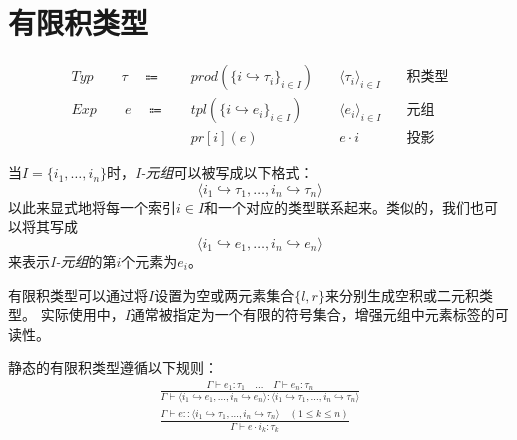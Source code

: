 \section{有限积类型}
\begin{equation*}
\begin{align}
Typ \qquad \tau \quad \Coloneqq \quad &prod(\{i \hookrightarrow \tau_i \}_{i\in I}) 
\quad &\langle \tau_i \rangle_{i\in I} \quad &\mbox{积类型} \\
Exp \qquad e \quad \Coloneqq \quad &tpl(\{i \hookrightarrow e_i \}_{i\in I}) 
\quad &\langle e_i \rangle_{i\in I} \quad &\mbox{元组} \\
&pr[i](e) \quad &e \cdot i \quad &\mbox{投影}
\end{align}
\end{equation*}


当$I=\{i_1,\dots,i_n\}$时，\textit{I-元组}可以被写成以下格式：
$$\langle i_1 \hookrightarrow \tau_1, \dots, i_n \hookrightarrow \tau_n \rangle$$
以此来显式地将每一个索引$i\in I$和一个对应的类型联系起来。类似的，我们也可以将其写成
$$\langle i_1 \hookrightarrow e_1, \dots, i_n \hookrightarrow e_n \rangle$$
来表示\textit{I-元组}的第$i$个元素为$e_i$。

有限积类型可以通过将$I$设置为空或两元素集合$\{l,r\}$来分别生成空积或二元积类型。
实际使用中，$I$通常被指定为一个有限的符号集合，增强元组中元素标签的可读性。

静态的有限积类型遵循以下规则：
\begin{subequations}
    \begin{gather}
    \frac{\Gamma \vdash e_1 : \tau_1 \quad \dots \quad \Gamma \vdash e_n : \tau_n}
    {\Gamma \vdash \langle i_1 \hookrightarrow e_1,\dots,i_n\hookrightarrow e_n \rangle 
    : \langle i_1 \hookrightarrow \tau_1,\dots,i_n \hookrightarrow \tau_n \rangle} \\
    \frac{\Gamma \vdash e : : \langle i_1 \hookrightarrow \tau_1,\dots,i_n \hookrightarrow \tau_n \rangle
    \quad (1\leq k \leq n)}
    {\Gamma \vdash e \cdot i_k : \tau_k}
    \end{gather}
\end{subequations}

